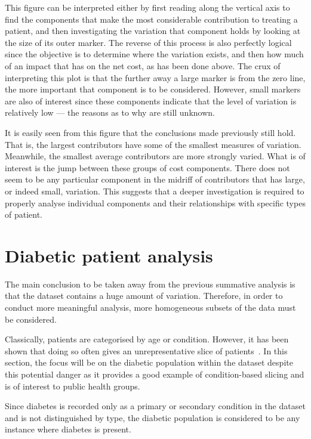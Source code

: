 This figure can be interpreted either by first reading along the vertical axis
to find the components that make the most considerable contribution to treating
a patient, and then investigating the variation that component holds by looking
at the size of its outer marker. The reverse of this process is also perfectly
logical since the objective is to determine where the variation exists, and then
how much of an impact that has on the net cost, as has been done above. The crux
of interpreting this plot is that the further away a large marker is from the
zero line, the more important that component is to be considered. However, small
markers are also of interest since these components indicate that the level of
variation is relatively low --- the reasons as to why are still unknown.

It is easily seen from this figure that the conclusions made previously still
hold. That is, the largest contributors have some of the smallest measures of
variation. Meanwhile, the smallest average contributors are more strongly
varied.  What is of interest is the jump between these groups of cost
components. There does not seem to be any particular component in the midriff of
contributors that has large, or indeed small, variation. This suggests that a
deeper investigation is required to properly analyse individual components and
their relationships with specific types of patient.


\section{Diabetic patient analysis}\label{sec:diabetes}
\graphicspath{{chapters/data/paper/img/diabetes/}}

The main conclusion to be taken away from the previous summative analysis is
that the dataset contains a huge amount of variation. Therefore, in order to
conduct more meaningful analysis, more homogeneous subsets of the data must be
considered.

Classically, patients are categorised by age or condition. However, it has been
shown that doing so often gives an unrepresentative slice of
patients~\cite{Vuik2016a}. In this section, the focus will be on the diabetic
population within the dataset despite this potential danger as it provides a
good example of condition-based slicing and is of interest to public health
groups.

Since diabetes is recorded only as a primary or secondary condition in the
dataset and is not distinguished by type, the diabetic population is considered
to be any instance where diabetes is present.

